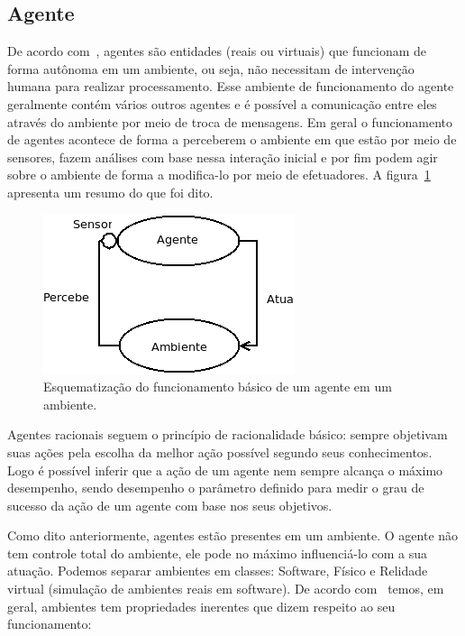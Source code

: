 \subsection{Agente}

De acordo com~\cite{novig95}, agentes são entidades (reais ou virtuais) que funcionam de forma autônoma em um ambiente, ou seja, não necessitam de intervenção humana para realizar processamento. Esse ambiente de funcionamento do agente geralmente contém vários outros agentes e é possível a comunicação entre eles através do ambiente por meio de troca de mensagens. Em geral o funcionamento de agentes acontece de forma a perceberem o ambiente em que estão por meio de sensores, fazem análises com base nessa interação inicial e por fim podem agir sobre o ambiente de forma a modifica-lo por meio de efetuadores. A figura~\ref{fig:agente-basico} apresenta um resumo do que foi dito.

\begin{figure}
	\centering
	\includegraphics[scale=0.75]{images/agente-basico.png}
	\caption{Esquematização do funcionamento básico de um agente em um ambiente.}
	\label{fig:agente-basico}
\end{figure}

Agentes racionais seguem o princípio de racionalidade básico: sempre objetivam suas ações pela escolha da melhor ação possível segundo seus conhecimentos. Logo é possível inferir que a ação de um agente nem sempre alcança o máximo desempenho, sendo desempenho o parâmetro definido para medir o grau de sucesso da ação de um agente com base nos seus objetivos.

Como dito anteriormente, agentes estão presentes em um ambiente. O agente não tem controle total do ambiente, ele pode no máximo influenciá-lo com a sua atuação. Podemos separar ambientes em classes: Software, Físico e Relidade virtual (simulação de ambientes reais em software). De acordo com~\cite{wooldridge04} temos, em geral, ambientes tem propriedades inerentes que dizem respeito ao seu funcionamento:

